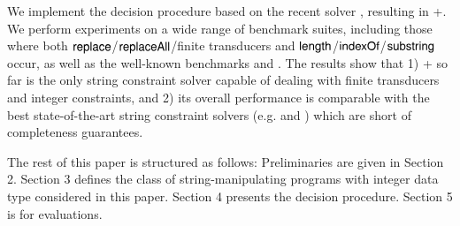 %
We implement the decision procedure based on %
the recent {\ostrich} solver \cite{CHL+19},  resulting in {\ostrich}+.  We perform experiments on a wide range of benchmark suites, including those where both $\mathsf{replace}$/$\mathsf{replaceAll}$/finite transducers and $\mathsf{length}$/$\mathsf{indexOf}$/$\mathsf{substring}$ occur, as well as the well-known benchmarks {\kaluzabench} and {\pyexbench}.
The results show that  %
1) {\ostrich}+ so far is the only string constraint solver capable of dealing with finite transducers and integer constraints, and 2) its overall performance is comparable with the best state-of-the-art string constraint solvers (e.g. {\cvc} and {\zthreetrau}) which are short of completeness guarantees. 

\hide{
\smallskip

}

The rest of this paper is structured as follows: Preliminaries are given in Section 2. Section 3 defines the class of string-manipulating programs with integer data type considered in this paper. Section 4 presents the decision procedure. Section 5 is for evaluations.  

%
